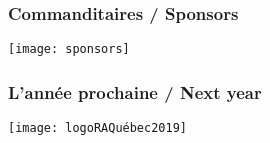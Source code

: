 \documentclass{beamer}
\begin{document}




\begin{frame}
  \frametitle{Commanditaires / Sponsors}
  \texttt{[image: sponsors]}
\end{frame}

\begin{frame}
  \frametitle{L'ann\'ee prochaine / Next year}
  \texttt{[image: logoRAQuébec2019]}
\end{frame}
\end{document}
